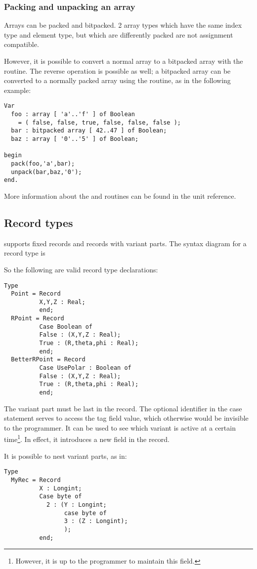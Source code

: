 \subsubsection{Packing and unpacking an array}
Arrays can be packed and bitpacked. 2 array types which have the same index
type and element type, but which are differently packed are not assignment 
compatible.

However, it is possible to convert a normal array to a bitpacked array with the
 routine. The reverse operation is possible as well; a bitpacked
array can be converted to a normally packed array using the 
routine, as in the following example:
\begin{verbatim}
Var
  foo : array [ 'a'..'f' ] of Boolean 
    = ( false, false, true, false, false, false );
  bar : bitpacked array [ 42..47 ] of Boolean;
  baz : array [ '0'..'5' ] of Boolean;

begin
  pack(foo,'a',bar);
  unpack(bar,baz,'0');
end.
\end{verbatim}
More information about the  and  routines can be found in the
 unit reference.

%
\subsection{Record types}
\fpc supports fixed records and records with variant parts.
The syntax diagram for a record type is

 So the following are valid record type declarations:
\begin{verbatim}
Type
  Point = Record
          X,Y,Z : Real;
          end;
  RPoint = Record
          Case Boolean of
          False : (X,Y,Z : Real);
          True : (R,theta,phi : Real);
          end;
  BetterRPoint = Record
          Case UsePolar : Boolean of
          False : (X,Y,Z : Real);
          True : (R,theta,phi : Real);
          end;
\end{verbatim}
The variant part must be last in the record. The optional identifier in the
case statement serves to access the tag field value, which otherwise would
be invisible to the programmer. It can be used to see which variant is
active at a certain time\footnote{However, it is up to the programmer to maintain
this field.}. In effect, it introduces a new field in the record.
\begin{remark}
It is possible to nest variant parts, as in:
\begin{verbatim}
Type
  MyRec = Record
          X : Longint;
          Case byte of
            2 : (Y : Longint;
                 case byte of
                 3 : (Z : Longint);
                 );
          end;
\end{verbatim}
\end{remark}

